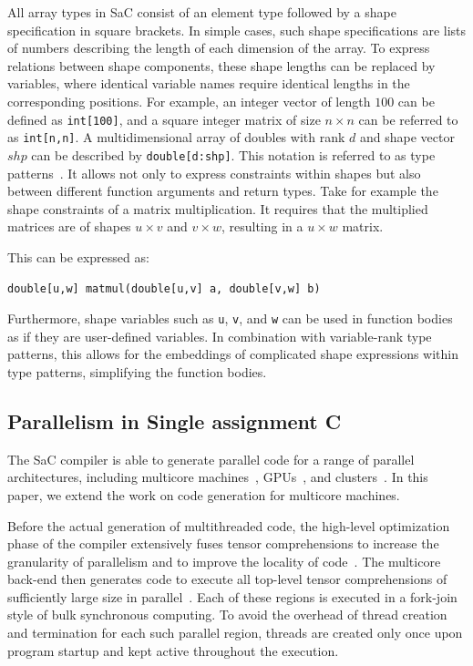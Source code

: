 \documentclass[runningheads]{llncs}
\begin{document}
All array types in SaC consist of an element type followed by a shape specification in square brackets.
In simple cases, such shape specifications are lists of numbers describing the length of each dimension of the array.
To express relations between shape components, these shape lengths can be replaced by variables, where identical variable names require identical lengths in the corresponding positions.
For example, an integer vector of length $100$ can be defined as \texttt{int[100]}, and a square integer matrix of size $n \times n$ can be referred to as \texttt{int[n,n]}.
A multidimensional array of doubles with rank $d$ and shape vector $shp$ can be described by \texttt{double[d:shp]}.
This notation is referred to as type patterns~\cite{aaldering2024type}.
It allows not only to express constraints within shapes but also between different function arguments and return types.
Take for example the shape constraints of a matrix multiplication.
It requires that the multiplied matrices are of shapes $u \times v$ and $v \times w$, resulting in a $u \times w$ matrix.

This can be expressed as:
\begin{verbatim}
double[u,w] matmul(double[u,v] a, double[v,w] b)
\end{verbatim}

Furthermore, shape variables such as \texttt{u}, \texttt{v}, and \texttt{w} can be used in function bodies as if they are user-defined variables.
In combination with variable-rank type patterns, this allows for the embeddings of complicated shape expressions within type patterns, simplifying the function bodies.

\subsection{Parallelism in Single assignment C}\label{sec:parallelism}
The SaC compiler is able to generate parallel code for a range of parallel architectures, including multicore machines~\cite{grelck2005shared}, GPUs~\cite{guo2011breaking,janssen2022mapping}, and clusters~\cite{macht2019sac}.
In this paper, we extend the work on code generation for multicore machines.

Before the actual generation of multithreaded code, the high-level optimization phase of the compiler extensively fuses tensor comprehensions to increase the granularity of parallelism and to improve the locality of code~\cite{grelck2006sac}.
The multicore back-end then generates code to execute all top-level tensor comprehensions of sufficiently large size in parallel~\cite{grelck2005shared}.
Each of these regions is executed in a fork-join style of bulk synchronous computing.
To avoid the overhead of thread creation and termination for each such parallel region, threads are created only once upon program startup and kept active throughout the execution.
\end{document}
